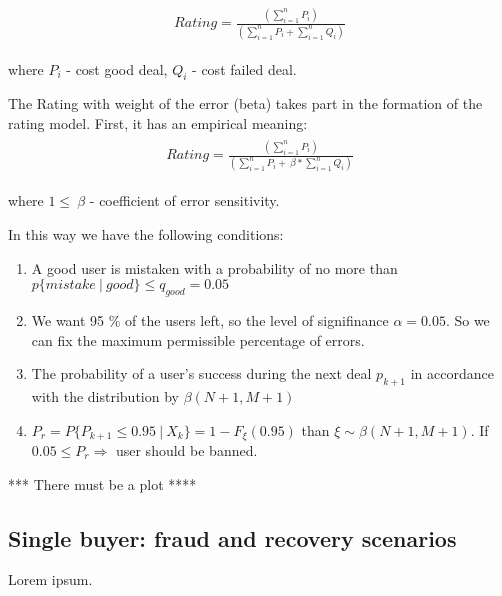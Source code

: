 \documentclass[11pt]{article}
\begin{document}
\begin{align}
\begin{split}
Rating = \frac{(\sum_{i=1}^{n}P_{i})} {(\sum_{i = 1}^{n}P_{i}+ \sum_{i = 1}^{n}Q_{i})}
\end{split}
\end{align}

where  $P_{i} $ - cost good deal, $ Q_{i}$ - cost failed deal.

The Rating with weight of the error (beta) takes part in the formation of the rating model. First, it has an empirical meaning:
\begin{align}
\begin{split}
Rating = \frac{(\sum_{i=1}^{n}P_{i})} {(\sum_{i = 1}^{n}P_{i}+ \ \beta * \sum_{i = 1}^{n}Q_{i})}
\end{split}
\end{align}

where  $  1 \leqslant \ \beta $ - coefficient of error sensitivity.

In this way we have the following conditions:

\begin{enumerate}
\item A good user is mistaken with a probability of no more than $ p\{mistake\ |\ good \}  \leqslant  q_{good}  = 0.05$
\item We want 95 \% of the users left, so the level of signifinance $\alpha= 0.05$. So we can fix the maximum permissible percentage of errors.
\item The probability of a user's success during the next deal $p _{k+1}$ in accordance with the distribution by $ \beta(N+1, M+1)$
\item  $P_{r} = P \{P_{k+1} \leq 0.95 \ |\ X_{k} \} = 1 - F_{\xi}(0.95)$ than ${\xi \sim \beta (N+1, M+1)}$.  If $0.05 \leq  P_{r}  \Rightarrow$ user should be banned.
\end{enumerate}

*** There must be a plot ****

\subsection{Single buyer: fraud and recovery scenarios} \label{appendix:fraudAndRecovery}

Lorem ipsum.


\newpage
\end{document}
